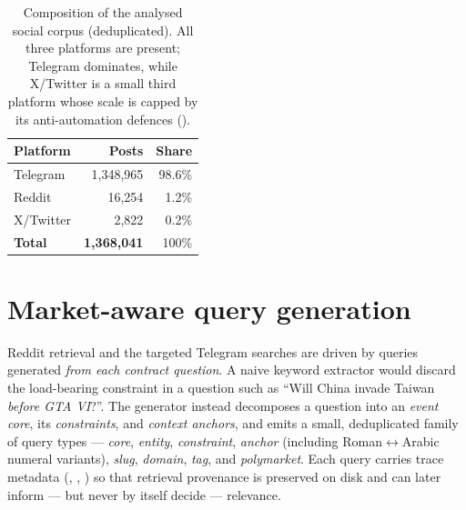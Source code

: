 \begin{table}[H]
\centering
\caption[Composition of the social corpus]{Composition of the analysed social corpus
(deduplicated). All three platforms are present; Telegram dominates, while X/Twitter is
a small third platform whose scale is capped by its anti-automation defences
().}
\label{tab:corpus}
\small
\begin{tabular}{@{}l r r@{}}
\toprule
\textbf{Platform} & \textbf{Posts} & \textbf{Share}\\
\midrule
Telegram   & 1{,}348{,}965 & 98.6\%\\
Reddit     & 16{,}254      & 1.2\%\\
X/Twitter  & 2{,}822       & 0.2\%\\
\midrule
\textbf{Total} & \textbf{1{,}368{,}041} & 100\%\\
\bottomrule
\end{tabular}
\end{table}

\section{Market-aware query generation}
\label{sec:querygen}
Reddit retrieval and the targeted Telegram searches are driven by queries generated
\emph{from each contract question}. A naive keyword extractor would discard the
load-bearing constraint in a question such as ``Will China invade Taiwan
\emph{before GTA VI}?''. The generator instead decomposes a question into an
\emph{event core}, its \emph{constraints}, and \emph{context anchors}, and emits a
small, deduplicated family of query types --- \emph{core}, \emph{entity},
\emph{constraint}, \emph{anchor} (including Roman$\leftrightarrow$Arabic numeral
variants), \emph{slug}, \emph{domain}, \emph{tag}, and \emph{polymarket}. Each query
carries trace metadata (, , ) so that
retrieval provenance is preserved on disk and can later inform --- but never by
itself decide --- relevance.

